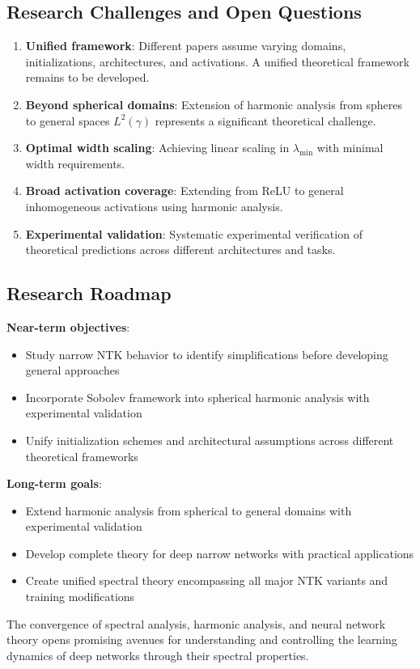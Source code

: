 \documentclass{article}
\begin{document}
\subsection{Research Challenges and Open Questions}

\begin{enumerate}
\item \textbf{Unified framework}: Different papers assume varying domains, initializations, architectures, and activations. A unified theoretical framework remains to be developed.

\item \textbf{Beyond spherical domains}: Extension of harmonic analysis from spheres to general spaces $L^2(\gamma)$ represents a significant theoretical challenge.

\item \textbf{Optimal width scaling}: Achieving linear scaling in $\lambda_{\min}$ with minimal width requirements.

\item \textbf{Broad activation coverage}: Extending from ReLU to general inhomogeneous activations using harmonic analysis.

\item \textbf{Experimental validation}: Systematic experimental verification of theoretical predictions across different architectures and tasks.
\end{enumerate}

\subsection{Research Roadmap}

\textbf{Near-term objectives}:
\begin{itemize}
\item Study narrow NTK behavior to identify simplifications before developing general approaches
\item Incorporate Sobolev framework into spherical harmonic analysis with experimental validation
\item Unify initialization schemes and architectural assumptions across different theoretical frameworks
\end{itemize}

\textbf{Long-term goals}:
\begin{itemize}
\item Extend harmonic analysis from spherical to general domains with experimental validation
\item Develop complete theory for deep narrow networks with practical applications
\item Create unified spectral theory encompassing all major NTK variants and training modifications
\end{itemize}

The convergence of spectral analysis, harmonic analysis, and neural network theory opens promising avenues for understanding and controlling the learning dynamics of deep networks through their spectral properties.

\newpage
\end{document}

